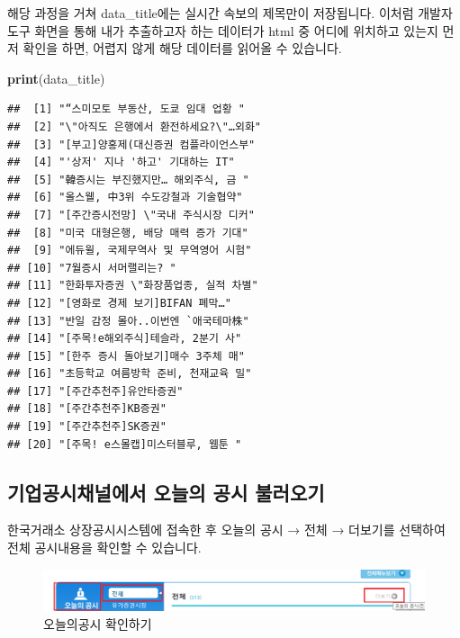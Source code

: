 \documentclass[12pt,]{book}
\newenvironment{Shaded}{\begin{snugshade}}{\end{snugshade}}
\newcommand{\KeywordTok}[1]{\textcolor[rgb]{0.13,0.29,0.53}{\textbf{#1}}}
\newcommand{\NormalTok}[1]{#1}
\begin{document}
해당 과정을 거쳐 data\_title에는 실시간 속보의 제목만이 저장됩니다. 이처럼 개발자도구 화면을 통해 내가 추출하고자 하는 데이터가 html 중 어디에 위치하고 있는지 먼저 확인을 하면, 어렵지 않게 해당 데이터를 읽어올 수 있습니다.

\begin{Shaded}
\begin{Highlighting}[]
\KeywordTok{print}\NormalTok{(data_title)}
\end{Highlighting}
\end{Shaded}

\begin{verbatim}
##  [1] "“스미모토 부동산, 도쿄 임대 업황 "   
##  [2] "\"아직도 은행에서 환전하세요?\"…외화"
##  [3] "[부고]양홍제(대신증권 컴플라이언스부" 
##  [4] "'상저' 지나 '하고' 기대하는 IT"       
##  [5] "韓증시는 부진했지만… 해외주식, 금 "  
##  [6] "올스웰, 中3위 수도강철과 기술협약"    
##  [7] "[주간증시전망] \"국내 주식시장 디커"  
##  [8] "미국 대형은행, 배당 매력 증가 기대"   
##  [9] "에듀윌, 국제무역사 및 무역영어 시험"  
## [10] "7월증시 서머랠리는? "                 
## [11] "한화투자증권 \"화장품업종, 실적 차별" 
## [12] "[영화로 경제 보기]BIFAN 폐막…"       
## [13] "반일 감정 몰아..이번엔 `애국테마株"   
## [14] "[주목!e해외주식]테슬라, 2분기 사"     
## [15] "[한주 증시 돌아보기]매수 3주체 매"    
## [16] "초등학교 여름방학 준비, 천재교육 밀"  
## [17] "[주간추천주]유안타증권"               
## [18] "[주간추천주]KB증권"                   
## [19] "[주간추천주]SK증권"                   
## [20] "[주목! e스몰캡]미스터블루, 웹툰 "
\end{verbatim}

\hypertarget{section-15}{%
\subsection{기업공시채널에서 오늘의 공시 불러오기}\label{section-15}}

한국거래소 상장공시시스템에 접속한 후 오늘의 공시 → 전체 → 더보기를 선택하여 전체 공시내용을 확인할 수 있습니다.

\begin{figure}[h]

{\centering \includegraphics[width=0.7\linewidth]{images/crawl_kind} 

}

\caption{오늘의공시 확인하기}\label{fig:unnamed-chunk-13}
\end{figure}
\end{document}
